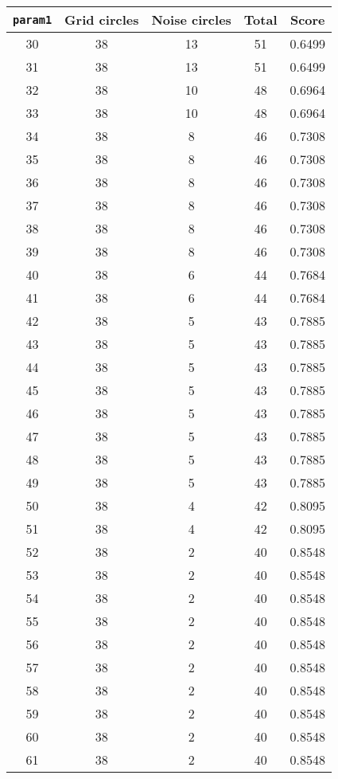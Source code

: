 \documentclass[letterpaper, 12pt]{article}
\begin{document}
\begin{longtable}{|c|c|c|c|c|}
\hline
\textbf{\texttt{param1}} & \textbf{Grid circles} & \textbf{Noise circles} & \textbf{Total} & \textbf{Score} \\
\hline
30 & 38 & 13 & 51 & 0.6499 \\
\hline
31 & 38 & 13 & 51 & 0.6499 \\
\hline
32 & 38 & 10 & 48 & 0.6964 \\
\hline
33 & 38 & 10 & 48 & 0.6964 \\
\hline
34 & 38 & 8 & 46 & 0.7308 \\
\hline
35 & 38 & 8 & 46 & 0.7308 \\
\hline
36 & 38 & 8 & 46 & 0.7308 \\
\hline
37 & 38 & 8 & 46 & 0.7308 \\
\hline
38 & 38 & 8 & 46 & 0.7308 \\
\hline
39 & 38 & 8 & 46 & 0.7308 \\
\hline
40 & 38 & 6 & 44 & 0.7684 \\
\hline
41 & 38 & 6 & 44 & 0.7684 \\
\hline
42 & 38 & 5 & 43 & 0.7885 \\
\hline
43 & 38 & 5 & 43 & 0.7885 \\
\hline
44 & 38 & 5 & 43 & 0.7885 \\
\hline
45 & 38 & 5 & 43 & 0.7885 \\
\hline
46 & 38 & 5 & 43 & 0.7885 \\
\hline
47 & 38 & 5 & 43 & 0.7885 \\
\hline
48 & 38 & 5 & 43 & 0.7885 \\
\hline
49 & 38 & 5 & 43 & 0.7885 \\
\hline
50 & 38 & 4 & 42 & 0.8095 \\
\hline
51 & 38 & 4 & 42 & 0.8095 \\
\hline
52 & 38 & 2 & 40 & 0.8548 \\
\hline
53 & 38 & 2 & 40 & 0.8548 \\
\hline
54 & 38 & 2 & 40 & 0.8548 \\
\hline
55 & 38 & 2 & 40 & 0.8548 \\
\hline
56 & 38 & 2 & 40 & 0.8548 \\
\hline
57 & 38 & 2 & 40 & 0.8548 \\
\hline
58 & 38 & 2 & 40 & 0.8548 \\
\hline
59 & 38 & 2 & 40 & 0.8548 \\
\hline
60 & 38 & 2 & 40 & 0.8548 \\
\hline
61 & 38 & 2 & 40 & 0.8548 \\

\end{longtable}
\end{document}
